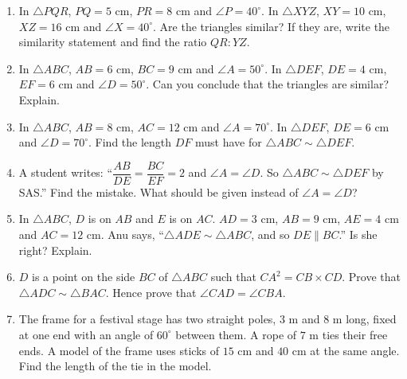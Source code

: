 \documentclass[11pt,a4paper]{article}
\theoremstyle{brand}
\theoremstyle{branddef}
\newcommand{\tr}{\triangle}
\newenvironment{exercise}[1]
  {\par\medskip\Needspace{7\baselineskip}\noindent{\large\bfseries\color{accent}Exercise #1}
   \par\smallskip
   \begin{enumerate}[leftmargin=*,itemsep=4pt]}
  {\end{enumerate}}
\begin{document}
\begin{exercise}{2F}
  \item In $\tr PQR$, $PQ=5$ cm, $PR=8$ cm and $\angle P=40^\circ$. In $\tr XYZ$, $XY=10$ cm, $XZ=16$ cm and $\angle X=40^\circ$. Are the triangles similar? If they are, write the similarity statement and find the ratio $QR:YZ$.
  \item In $\tr ABC$, $AB=6$ cm, $BC=9$ cm and $\angle A=50^\circ$. In $\tr DEF$, $DE=4$ cm, $EF=6$ cm and $\angle D=50^\circ$. Can you conclude that the triangles are similar? Explain.
  \item In $\tr ABC$, $AB=8$ cm, $AC=12$ cm and $\angle A=70^\circ$. In $\tr DEF$, $DE=6$ cm and $\angle D=70^\circ$. Find the length $DF$ must have for $\tr ABC\sim\tr DEF$.
  \item A student writes: ``$\dfrac{AB}{DE}=\dfrac{BC}{EF}=2$ and $\angle A=\angle D$. So $\tr ABC\sim\tr DEF$ by SAS.'' Find the mistake. What should be given instead of $\angle A=\angle D$?
  \item In $\tr ABC$, $D$ is on $AB$ and $E$ is on $AC$. $AD=3$ cm, $AB=9$ cm, $AE=4$ cm and $AC=12$ cm. Anu says, ``$\tr ADE\sim\tr ABC$, and so $DE\parallel BC$.'' Is she right? Explain.
  \item $D$ is a point on the side $BC$ of $\tr ABC$ such that $CA^2=CB\times CD$. Prove that $\tr ADC\sim\tr BAC$. Hence prove that $\angle CAD=\angle CBA$.
\begin{center}\end{center}
  \item The frame for a festival stage has two straight poles, $3$ m and $8$ m long, fixed at one end with an angle of $60^\circ$ between them. A rope of $7$ m ties their free ends. A model of the frame uses sticks of $15$ cm and $40$ cm at the same angle. Find the length of the tie in the model.
\end{exercise}
\end{document}
